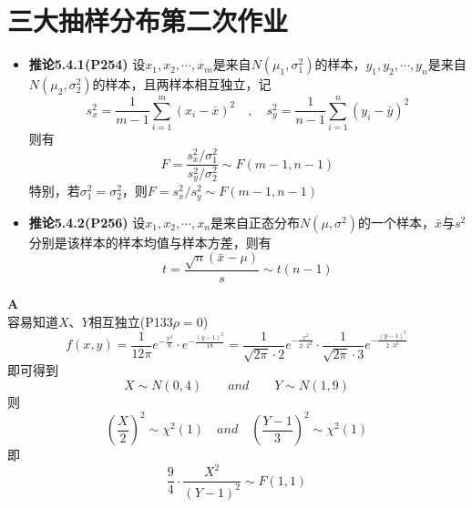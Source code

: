 \documentclass[a4paper]{ctexart}    %
\begin{document}
	\section{三大抽样分布第二次作业}
	\begin{tcolorbox}
		[
		colframe=blue!25,
		colback=blue!10,
		coltitle=blue!20!black,  
		fonttitle=\bfseries,
		adjusted title=Formula Or Theorem:
		]
		\begin{itemize}
			\item \textbf{推论5.4.1(P254)} 设$ x_1, x_2, \cdots, x_m $是来自$ N(\mu_1, \sigma_1^2) $的样本，$ y_1, y_2, \cdots, y_n $是来自$ N(\mu_2, \sigma_2^2) $的样本，且两样本相互独立，记
			\begin{equation*}
				s_x^2 = \frac{1}{m-1}\sum\limits_{i=1}^{m}(x_i - \bar{x})^2 \quad , \quad s_y^2 = \frac{1}{n-1}\sum\limits_{i=1}^{n}(y_i - \bar{y})^2
			\end{equation*}
			则有
			\begin{equation*}
				F = \frac{s_x^2 / \sigma_1^2}{s_y^2 / \sigma_2^2} \sim F(m-1, n-1)
			\end{equation*}
			特别，若$ \sigma_1^2 = \sigma_2^2 $，则$ F = s_x^2 / s_y^2 \sim F(m-1, n-1) $
			\item \textbf{推论5.4.2(P256)} 设$ x_1, x_2, \cdots, x_n $是来自正态分布$ N(\mu, \sigma^2) $的一个样本，$ \bar{x} $与$ s^2 $分别是该样本的样本均值与样本方差，则有
			\begin{equation*}
				t = \frac{\sqrt{n}(\bar{x} - \mu)}{s} \sim t(n-1)
			\end{equation*}
		\end{itemize}
	\end{tcolorbox}
	 \quad \textbf{A} \\
	容易知道$ X $、$ Y $相互独立(P133\quad $ \rho = 0 $) \\
	\begin{equation*}
		f(x, y) = \frac{1}{12\pi} e^{-\frac{x^2}{8}}\cdot e^{-\frac{(y-1)^2}{18}} = \frac{1}{\sqrt{2\pi} \cdot 2} e^{-\frac{x^2}{2\cdot 2^2}}\cdot \frac{1}{\sqrt{2\pi} \cdot 3} e^{-\frac{(y-1)^2}{2\cdot 3^2}}
	\end{equation*}
	即可得到
	\begin{equation*}
		X \sim N(0, 4) \qquad and \qquad Y \sim N(1, 9)
	\end{equation*}
	则
	\begin{equation*}
		\left(\frac{X}{2}\right)^2 \sim \chi^2(1) \quad and \quad \left(\frac{Y-1}{3}\right)^2 \sim \chi^2(1)
	\end{equation*}
	即
	\begin{equation*}
		\frac{9}{4}\cdot \frac{X^2}{(Y-1)^2} \sim F(1, 1)
	\end{equation*}
\end{document}
